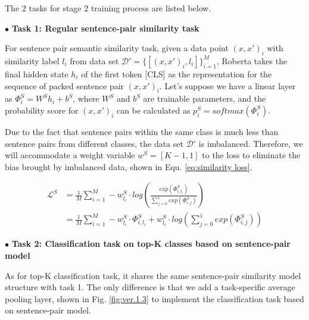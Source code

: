 \documentclass[letterpaper]{article} %
\begin{document}
  The 2 tasks for stage 2 training process are listed below.

  $\bullet$ \textbf{Task 1: Regular sentence-pair similarity task}

  For  sentence  pair semantic similarity task, given a data point $(x, x')_{i}$
  with       similarity       label       $l_{i}$       from       data      set
  $\mathcal{D'}=\{[(x,x')_{i},l_{i}]\}_{i=1}^{M}$,   Roberta   takes  the  final
  hidden  state  $h_{i}$  of the first token [CLS] as the representation for the
  sequence of packed sentence pair $(x, x')_{i}$. Let's suppose we have a linear
  layer  as  ${\Phi}^S_{i}=W^Sh_{i}+b^S$,  where  $W^S$  and $b^S$ are trainable
  parameters,  and  the probability score for $(x, x')_{i}$ can be calculated as
  $p^S_{i}=softmax({\Phi}^S_{i})$.

  Due  to  the  fact that sentence pairs within the same class is much less than
  sentence  pairs  from  different  classes,  the  data  set  $\mathcal{D'}$  is
  imbalanced.  Therefore, we will accommodate a weight variable $w^S = [K-1, 1]$
  to  the  loss  to eliminate the bias brought by imbalanced data, shown in Equ.
  \ref{eq:similarity loss}.

  \begin{equation}
    \begin{aligned}
      \mathcal{L}^{S}&=\frac{1}{M}\sum_{i=1}^{M}-w^S_{l_i}\cdot log(\frac{exp(\varPhi_{i,l_{i}}^S)}{\sum_{j=0}^{1}exp(\varPhi_{i,j}^S)}) \\&=\frac{1}{M}\sum_{i=1}^{M}-w^S_{l_i}\cdot \varPhi_{i,l_{i}}^S+w^S_{l_i}\cdot log(\sum_{j=0}^{1}exp(\varPhi_{i,j}^S))
      \label{eq:similarity loss}
    \end{aligned}
  \end{equation}

  $\bullet$ \textbf{Task 2: Classification task on top-K classes based on sentence-pair model}

  As  for top-K classification task, it shares the same sentence-pair similarity
  model   structure  with  task  1.  The  only  difference  is  that  we  add  a
  task-specific  average  pooling  layer,  shown  in  Fig.  \ref{fig:ver.1.3} to
  implement the classification task based on sentence-pair model.
\end{document}
